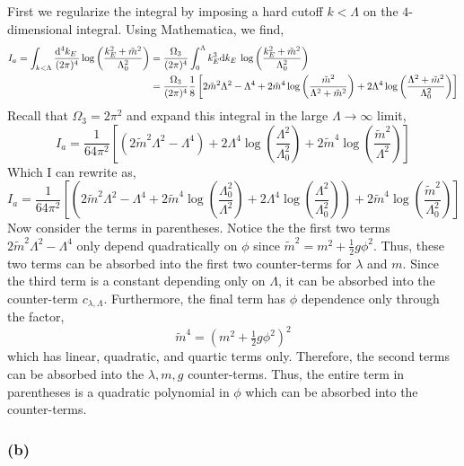 \documentclass[12pt]{article}
\begin{document}
First we regularize the integral by imposing a hard cutoff $k < \Lambda$ on the $4$-dimensional integral. Using Mathematica, we find,
\begin{align*}
I_a = \int_{k < \Lambda} \frac{\mathrm{d}^{4} k_E \:}{(2\pi)^4} \log{\left( \frac{k_E^2 + \tilde{m}^2}{\Lambda_0^2} \right)} & = \frac{\Omega_3}{(2 \pi)^4} \int_{0}^{\Lambda} {k_E^3 \mathrm{d}k_E \:} \log{\left( \frac{k_E^2 + \tilde{m}^2}{\Lambda_0^2} \right)}
\\
& = \frac{\Omega_3}{(2 \pi)^4} \frac{1}{8} \left[ 2 \tilde{m}^2 \Lambda^2 - \Lambda^4 + 2 \tilde{m}^4 \log{\left( \frac{\tilde{m}^2}{\Lambda^2 + \tilde{m}^2} \right)} + 2 \Lambda^4 \log{\left( \frac{ \Lambda^2 + \tilde{m}^2 }{\Lambda_0^2} \right)} \right] 
\end{align*}
Recall that $\Omega_3 = 2 \pi^2$ and expand this integral in the large $\Lambda \to \infty$ limit,
\[ I_a = \frac{1}{64 \pi^2} \left[ \left( 2 \tilde{m}^2 \Lambda^2 - \Lambda^4 \right) + 2 \Lambda^4 \log{ \left( \frac{\Lambda^2}{\Lambda_0^2} \right) } + 2 \tilde{m}^4 \log{\left( \frac{\tilde{m}^2}{\Lambda^2} \right)} \right] \]
Which I can rewrite as,
\[ I_a = \frac{1}{64 \pi^2} \left[ \left( 2 \tilde{m}^2 \Lambda^2 - \Lambda^4 + 2 \tilde{m}^4 \log{\left( \frac{\Lambda_0^2}{\Lambda^2} \right)}  + 2 \Lambda^4 \log{ \left( \frac{\Lambda^2}{\Lambda_0^2} \right) } \right) + 2 \tilde{m}^4 \log{\left( \frac{\tilde{m}^2}{\Lambda_0^2} \right)} \right] \]
Now consider the terms in parentheses. Notice the the first two terms $2 \tilde{m}^2 \Lambda^2 - \Lambda^4$ only depend quadratically on $\phi$ since $\tilde{m}^2 = m^2 + \tfrac{1}{2} g \phi^2$. Thus, these two terms can be absorbed into the first two counter-terms for $\lambda$ and $m$. Since the third term is a constant depending only on $\Lambda$, it can be absorbed into the counter-term $c_{\lambda, \Lambda}$. Furthermore, the final term has $\phi$ dependence only through the factor,
\[ \tilde{m}^4 = \left( m^2 + \tfrac{1}{2} g \phi^2 \right)^2 \]
which has linear, quadratic, and quartic terms only. Therefore, the second terms can be absorbed into the $\lambda, m, g$ counter-terms.
Thus, the entire term in parentheses is a quadratic polynomial in $\phi$ which can be absorbed into the counter-terms. 

\subsubsection*{(b)}
\end{document}
